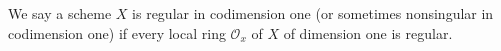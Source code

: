 We say a scheme $X$ is regular in codimension one (or sometimes nonsingular in codimension one) if every local ring $\mathcal{O}_x$ of $X$ of dimension one is regular.
